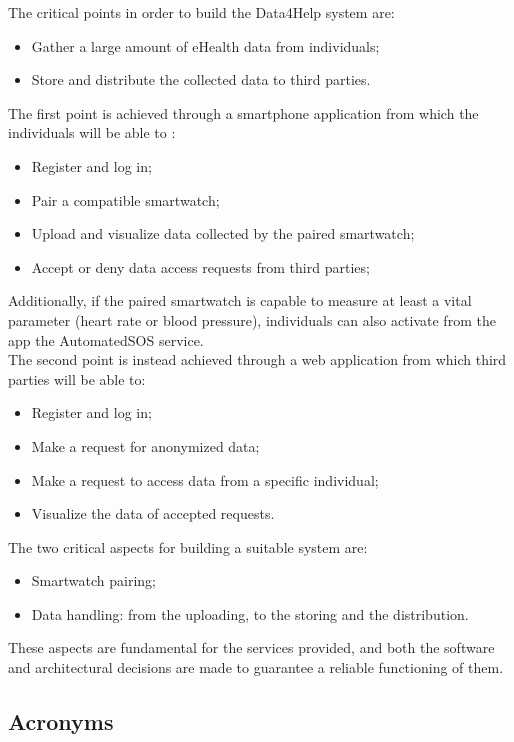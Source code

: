 The critical points in order to build the Data4Help system are:
\begin{itemize}
\item Gather a large amount of eHealth data from individuals;
\item Store and distribute the collected data to third parties.
\end{itemize}
The first point is achieved through a smartphone application from which the individuals will be able to :
\begin{itemize}
\item Register and log in;
\item Pair a compatible smartwatch;
\item Upload and visualize data collected by the paired smartwatch;
\item Accept or deny data access requests from third parties;
\end{itemize}
Additionally, if the paired smartwatch is capable to measure at least a vital parameter (heart rate or blood pressure), individuals can also activate from the app the AutomatedSOS service.
\\
The second point is instead achieved through a web application from which third parties will be able to:
\begin{itemize}
\item Register and log in;
\item Make a request for anonymized data;
\item Make a request to access data from a specific individual;
\item Visualize the data of accepted requests.
\end{itemize}

The two critical aspects for building a suitable system are:

\begin{itemize}
\item Smartwatch pairing;
\item Data handling: from the uploading, to the storing and the distribution.
\end{itemize}

These aspects are fundamental for the services provided, and both the software and architectural decisions are made to guarantee a reliable functioning of them.





\subsection{Acronyms}

